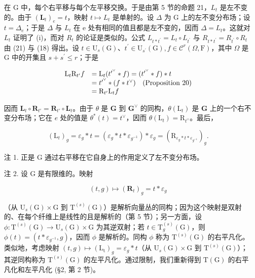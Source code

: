 在 G 中，每个右平移与每个左平移交换。于是由第 5 节的命题 21，\(L_{t}\) 是左不变的。由于 \((\mathbf{L}_{t})_{e}=t\)，映射 \(t\mapsto L_{t}\) 是单射的。设 \(\Delta\) 为 G 上的左不变分布场；设 \(t=\Delta_{e}\)；于是 \(\Delta\) 与 \(L_{t}\) 在 e 处有相同的值且都是左不变的，因而 \(\Delta=L_{t}\)。这就对 \(L_{t}\) 证明了 (i)，而对 \(R_{t}\) 的论证是类似的。公式 \(L_{t*t^{\prime}}=L_{t}\circ L_{t^{\prime}}\) 与 \(R_{t*t^{\prime}}=R_{t^{\prime}}\circ R_{t}\) 由 (21) 与 (18) 得出。设 \(t\in\mathrm{U}_{s}(\mathrm{G})\)、\(t^{\prime}\in\mathrm{U}_{s^{\prime}}(\mathrm{G}), f\in\mathcal{C}^{r}(\Omega,\mathrm{F})\)，其中 \(\Omega\) 是 G 中的开集且 \(s+s^{\prime}\leqslant r\)；于是

\[
\begin{array}{r l} \mathrm{L} _ {t} \mathrm{R} _ {t ^ {\prime}} f & = \mathrm{L} _ {t} (t ^ {\prime^ {\vee}} * f) = (t ^ {\prime^ {\vee}} * f) * t \\ & = t ^ {\prime^ {\vee}} * (f * t ^ {\vee}) \quad \text {(Proposition 20)} \\ & = \mathrm{R} _ {t ^ {\prime}} \mathrm{L} _ {t} f \end{array}
\]

因而 \(\mathbf{L}_t\circ \mathbf{R}_{t'} = \mathbf{R}_{t'}\circ \mathbf{L}_t\)。由于 \(\theta\) 是 \(\mathbf{G}\) 到 \(\mathbf{G}^{\vee}\) 的同构，\(\theta (\mathrm{L}_t)\) 是 \(\mathbf{G}\) 上的一个右不变分布场；它在 \(e\) 处的值是 \(\theta^{*}(t) = t^{\vee}\)，因而 \(\theta (\mathrm{L}_t) = \mathrm{R}_{t^{\vee}}\)。最后，

\[
\left(\mathrm{L} _ {t}\right) _ {g} = \varepsilon_ {g} * t = \left(\varepsilon_ {g} * t * \varepsilon_ {g^{-1}}\right) * \varepsilon_ {g} = \left(\mathrm{R} _ {\varepsilon_ {g} * t * \varepsilon_ {g^{-1}}}\right) _ {g}.
\]

注 1. 正是 G 通过右平移在它自身上的作用定义了左不变分布场。

注 2. 设 G 是有限维的。映射

\[
(t, g) \mapsto (\mathbf {R} _ {t}) _ {g} = t * \varepsilon_ {g}
\]

（从 \(\mathrm{U}_{s}(\mathrm{G})\times\mathrm{G}\) 到 \(\mathrm{T}^{(s)}(\mathrm{G})\)）是解析向量丛的同构；因为这个映射是双射的、在每个纤维上是线性的且是解析的（第 5 节）；另一方面，设 \(\phi:\mathrm{T}^{(s)}(\mathrm{G})\to\mathrm{U}_{s}(\mathrm{G})\times\mathrm{G}\) 为其逆双射；若 \(t\in\mathrm{T}_{g}^{(s)}(\mathrm{G})\)，则 \(\phi(t)=(t*\varepsilon_{g^{-1}},g)\)，因而 \(\phi\) 是解析的。同构 \(\phi\) 称为 \(\mathrm{T}^{(s)}(\mathrm{G})\) 的右平凡化。类似地，考虑映射 \((t,g)\mapsto(\mathrm{L}_{\mathrm{t}})_{g}=\varepsilon_{g}*t\)（从 \(\mathrm{U}_{s}(\mathrm{G})\times\mathrm{G}\) 到 \(\mathrm{T}^{(s)}(\mathrm{G})\)）；其逆同构称为 \(\mathrm{T}^{(s)}(\mathrm{G})\) 的左平凡化。通过限制，我们重新得到 \(\mathrm{T}(\mathrm{G})\) 的右平凡化和左平凡化 (§2, 第 2 节)。

